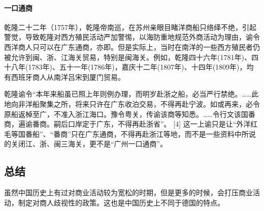 \paragraph{一口通商}
乾隆二十二年（1757年），乾隆帝南巡，在苏州亲眼目睹洋商船只络绎不绝，引起警觉，导致乾隆对西方殖民活动严加警惕，以海防重地规范外商活动为理由，谕令西洋商人只可以在广东通商，亦即。但是实际上，当时在南洋的一些西方殖民者仍被允许到闽、浙、江海关贸易，特别是闽海关。例如，乾隆四十六年(1781年)、四十八年(1783年)、五十一年(1786年)，嘉庆十二年(1807年)、十四年(1809年)，均有西班牙商人从南洋吕宋到厦门贸易。

乾隆谕令“本年来船虽已照上年则例办理，而明岁赴浙之船，必当严行禁绝。……此地向非洋船聚集之所，将来只许在广东收泊交易，不得再赴宁波。如或再来，必令原船返棹至广，不准入浙江海口。豫令粤关，传谕该商等知悉。……令行文该国番商，遍谕番商。嗣后口岸定于广东，不得再赴浙省”。 [4]  这一上谕只是让“外洋红毛等国番船”、“番商”只在广东通商，不得再赴浙江等地，而不是一些资料中所说的关闭江、浙、闽三海关，更不是“广州一口通商”。

\subsection{总结}

虽然中国历史上有过对商业活动较为宽松的时期，但是更多的时候，会打压商业活动，制定对商人歧视性的政策。这也是中国历史上不同于德国的特点。

